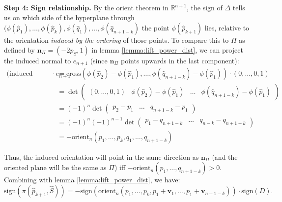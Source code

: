 \documentclass[12pt]{article}
\makeatletter
\theoremstyle{definition}
\theoremstyle{remark}
\renewenvironment{proof}[1][\proofname]{\par
  \pushQED{\qed}%
  \normalfont \footnotesize \topsep6\p@\@plus6\p@\relax
  \list{}{\leftmargin=2em
          \settowidth{\itemindent}{\itshape#1}%
          \labelwidth=\itemindent
          \parsep=0pt \listparindent=\parindent 
  }
  \item[\hskip\labelsep
        \itshape
    #1\@addpunct{.}]\ignorespaces
}{%
  \popQED\endlist\@endpefalse
}
\makeatother
\begin{document}
\begin{proof}
\bigskip\noindent
\textbf{Step 4: Sign relationship.}
By the orient theorem in $\mathbb{R}^{n+1}$, the sign of $\Delta$ tells us 
on which side of the hyperplane through $(\phi(\hat p_1), \ldots, \phi(\hat p_k), \phi(\hat q_1), \ldots, \phi(\hat q_{n+1-k})$ 
the point $\phi(\hat p_{k+1})$ lies, relative to the orientation 
\emph{induced by the ordering} of those points. To compare this to 
$\Pi$ as defined by $\mathbf{n}_\Pi = (-2p_S, 1)$ in lemma \ref{lemma:lift_power_dist}, we can project the induced normal to $e_{n+1}$ (since $\mathbf{n}_\Pi$ points upwards in the last component):
\begin{align*}
    \text{(induced normal)} \cdot e_{n+1}
    &=\mathrm{cross}\left( \phi(\hat p_2) - \phi(\hat p_1), \ldots, \phi (\hat q_{n+1-k})- \phi(\hat p_1)\right) \cdot (0, \ldots,0, 1) \\
    &=\det \left(  \begin{array}{c|c|c|c}
            (0,\ldots, 0, 1) & \phi(\hat p_2) - \phi(\hat p_1) &\ldots & \phi (\hat q_{n+1-k})- \phi(\hat p_1)
    \end{array}\right)\\
    &= (-1)^{n} \det \left(  \begin{array}{c|c|c}
            p_2 - p_1 &\ldots & q_{n+1-k}- p_1
    \end{array}\right)\\
    &= (-1)^{n}(-1)^{n-1} \det \left(  \begin{array}{c|c|c}
            p_1 - q_{n+1-k} &\ldots & q_{n-k}- q_{n+1-k}
    \end{array}\right)\\
    &= -\mathrm{orient}_n \left( p_1, \ldots,p_k, q_1, \ldots, q_{n+1-k}\right)
\end{align*}

Thus, the induced orientation will point in the same direction as $\mathbf{n}_\Pi$ (and the oriented plane will be the same as $\Pi$) iff $-\mathrm{orient}_n \left( p_1, \ldots, q_{n+1-k}\right) > 0$. Combining with lemma \ref{lemma:lift_power_dist}, we have:
\begin{equation*}
    \mathrm{sign}(\pi(\hat p_{k+1}, \hat S)) = -\mathrm{sign}\left( \mathrm{orient}_n(p_1, \ldots, p_k, p_1 + \mathbf{v}_1, \ldots, p_1 + \mathbf{v}_{n+1-k}) \right) \cdot \mathrm{sign}(D).
\end{equation*}


\end{proof}
\end{document}
